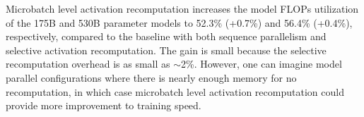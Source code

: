 \documentclass{article}
\begin{document}
Microbatch level activation recomputation increases the model FLOPs utilization of the 175B and 530B parameter models to 52.3\% (+0.7\%) and 56.4\% (+0.4\%), respectively, compared to the baseline with both sequence parallelism and selective activation recomputation. The gain is small because the selective recomputation overhead is as small as $\sim$2\%. However, one can imagine model parallel configurations where there is nearly enough memory for no recomputation, in which case microbatch level activation recomputation could provide more improvement to training speed.
\end{document}

